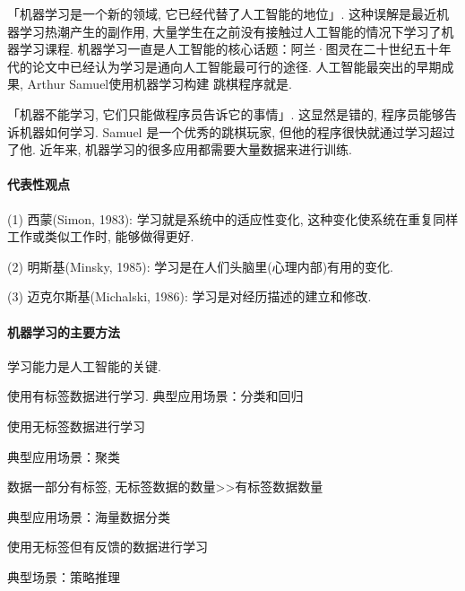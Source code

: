 「机器学习是一个新的领域, 它已经代替了人工智能的地位」. 这种误解是最近机器学习热潮产生的副作用, 大量学生在之前没有接触过人工智能的情况下学习了机器学习课程. 机器学习一直是人工智能的核心话题：阿兰·图灵在二十世纪五十年代的论文中已经认为学习是通向人工智能最可行的途径. 人工智能最突出的早期成果, Arthur Samuel使用机器学习构建 跳棋程序就是.

「机器不能学习, 它们只能做程序员告诉它的事情」. 这显然是错的, 程序员能够告诉机器如何学习. Samuel 是一个优秀的跳棋玩家, 但他的程序很快就通过学习超过了他. 近年来, 机器学习的很多应用都需要大量数据来进行训练.
\paragraph{代表性观点}

    (1) 西蒙(Simon, 1983): 学习就是系统中的适应性变化, 这种变化使系统在重复同样工作或类似工作时, 能够做得更好.

    (2) 明斯基(Minsky, 1985): 学习是在人们头脑里(心理内部)有用的变化.

    (3) 迈克尔斯基(Michalski, 1986): 学习是对经历描述的建立和修改.

\paragraph{机器学习的主要方法}
学习能力是人工智能的关键.
\begin{tcolorbox}[colback=white!50,colframe=orange!50,title=监督学习( Supervised learning)]
    使用有标签数据进行学习. 典型应用场景：分类和回归
\end{tcolorbox}

\begin{tcolorbox}[colback=white!50,colframe=orange!50,title=非监督学习( Unsupervised learning)]
使用无标签数据进行学习

典型应用场景：聚类
\end{tcolorbox}

\begin{tcolorbox}[colback=white!50,colframe=orange!50,title=半监督学习( Semi-supervised learning)]
数据一部分有标签, 无标签数据的数量>>有标签数据数量

典型应用场景：海量数据分类
\end{tcolorbox}

\begin{tcolorbox}[colback=white!50,colframe=orange!50,title=强化学习( Reinforcement learning)]
使用无标签但有反馈的数据进行学习

典型场景：策略推理
\end{tcolorbox}

